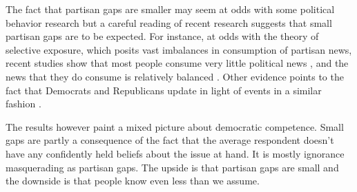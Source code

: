 \documentclass[12pt, letterpaper]{article}
\begin{document}
The fact that partisan gaps are smaller may seem at odds with some political behavior research but a careful reading of recent research suggests that small partisan gaps are to be expected. For instance, at odds with the theory of selective exposure, which posits vast imbalances in consumption of partisan news, recent studies show that most people consume very little political news \citep{Prior2007,flaxmanetal_2016}, and the news that they do consume is relatively balanced \citep{flaxmanetal_2016,garzetal_2018,gentzkowshapiro_2011,guess_2020}. Other evidence points to the fact that Democrats and Republicans update in light of events in a similar fashion \citep{gerber_annual_review,kernell_2019}.

The results however paint a mixed picture about democratic competence. Small gaps are partly a consequence of the fact that the average respondent doesn't have any confidently held beliefs about the issue at hand. It is mostly ignorance masquerading as partisan gaps. The upside is that partisan gaps are small and the downside is that people know even less than we assume.

\clearpage



\clearpage


\end{document}
